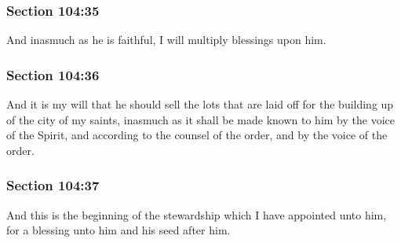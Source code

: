 	\subsubsection{Section 104:35} %
		\label{DC104-35}

		And inasmuch as he is faithful, I will multiply blessings upon him.


	\subsubsection{Section 104:36} %
		\label{DC104-36}

		And it is my will that he should sell the lots that are laid off for the building up of the city of my saints, inasmuch as it shall be made known to him by the voice of the Spirit, and according to the counsel of the order, and by the voice of the order.


	\subsubsection{Section 104:37} %
		\label{DC104-37}

		And this is the beginning of the stewardship which I have appointed unto him, for a blessing unto him and his seed after him.


